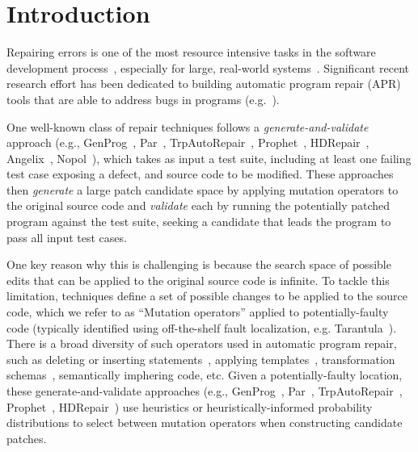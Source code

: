 \documentclass[conference]{IEEEtran}
\begin{document}
\section{Introduction} \label{introduction}

Repairing errors is one of the most 
resource intensive tasks in 
the software development process~\cite{Weiss07,Tassey02,Britton13}, especially for large, real-world systems~\cite{Liblit03,Anvik05}.
%
Significant recent research effort has been dedicated to
building automatic program repair (APR) tools that are able to address
bugs in 
programs (e.g.~\cite{legoues12,kim2013,Weimer13,long15SPR,long16proph,debroy10,perkins09,wei10}).

One well-known class of repair techniques follows a 
\emph{generate-and-validate} approach (e.g., GenProg~\cite{legoues12}, 
Par~\cite{kim2013}, TrpAutoRepair~\cite{Qi13TrpAutoR},
Prophet~\cite{long16proph}, HDRepair~\cite{xuan16}, Angelix~\cite{Mechtaev2016},
Nopol~\cite{xuanNopol}), which takes as input a test suite, 
including at
least one failing test case exposing
a defect, and source code to be 
modified.  These approaches then \emph{generate} a large patch candidate space 
by applying 
mutation operators to the original source code and \emph{validate} each by
running the potentially patched program against the test suite, seeking a candidate that
leads the program to pass all input test cases. 

One key reason why this is challenging is because the search space of possible edits that can be applied to the original source code is infinite. To tackle this limitation, techniques define a set of possible changes to be
applied to the source code, which we refer to as ``Mutation operators'' applied to potentially-faulty code (typically identified using off-the-shelf fault 
localization, e.g. Tarantula~\cite{Jones02}). 
There is a broad diversity of such operators used in automatic program repair, such as deleting or inserting 
statements~\cite{legoues12}, applying templates~\cite{kim2013}, transformation 
schemas~\cite{long16proph,long15SPR}, semantically imphering code\cite{nguyen13,Mechtaev2016,xuanNopol}, etc.
Given a potentially-faulty location, these
generate-and-validate approaches (e.g., GenProg~\cite{legoues12}, 
Par~\cite{kim2013}, TrpAutoRepair~\cite{Qi13TrpAutoR},
Prophet~\cite{long16proph}, HDRepair~\cite{xuan16}) use heuristics or
heuristically-informed probability distributions to select between
mutation operators
when constructing candidate patches.
\end{document}
